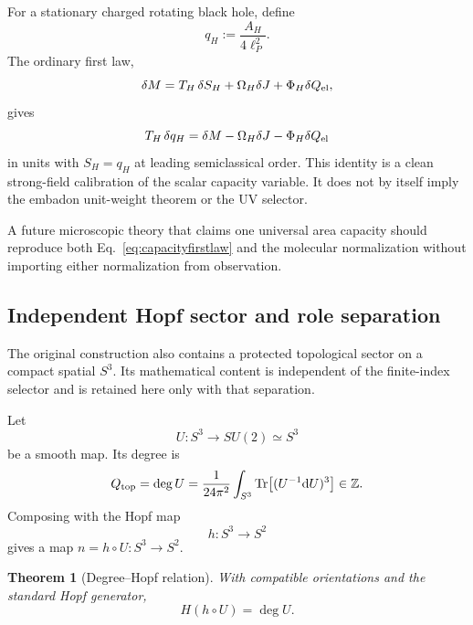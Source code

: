 \documentclass[aps,prd,preprint,nofootinbib,superscriptaddress]{revtex4-2}
\newtheorem{theorem}{Theorem}[section]
\theoremstyle{definition}
\theoremstyle{remark}
\newcommand{\Tr}{\operatorname{Tr}}
\newcommand{\dd}{\mathrm d}
\begin{document}
For a stationary charged rotating black hole, define
\begin{equation}
q_H:=\frac{A_H}{4\ell_P^2}.
\end{equation}
The ordinary first law,
\begin{equation}
\delta M
=
T_H\,\delta S_H+\Omega_H\delta J+\Phi_H\delta Q_{\rm el},
\end{equation}
gives
\begin{equation}
T_H\,\delta q_H
=
\delta M-\Omega_H\delta J-\Phi_H\delta Q_{\rm el}
\label{eq:capacityfirstlaw}
\end{equation}
in units with $S_H=q_H$ at leading semiclassical order.  This identity is a
clean strong-field calibration of the scalar capacity variable.  It does not
by itself imply the embadon unit-weight theorem or the UV selector.

A future microscopic theory that claims one universal area capacity should
reproduce both Eq.~\eqref{eq:capacityfirstlaw} and the molecular normalization
without importing either normalization from observation.

\subsection{Independent Hopf sector and role separation}

The original construction also contains a protected topological sector on a
compact spatial $S^3$.  Its mathematical content is independent of the
finite-index selector and is retained here only with that separation.

Let
\begin{equation}
U:S^3\longrightarrow SU(2)\simeq S^3
\label{eq:Umap}
\end{equation}
be a smooth map.  Its degree is
\begin{equation}
Q_{\rm top}
=
\deg U
=
\frac{1}{24\pi^2}
\int_{S^3}
\Tr\!\left[(U^{-1}\dd U)^3\right]
\in\mathbb Z.
\label{eq:degreeU}
\end{equation}
Composing with the Hopf map
\begin{equation}
h:S^3\to S^2
\end{equation}
gives a map $n=h\circ U:S^3\to S^2$.

\begin{theorem}[Degree--Hopf relation]
\label{thm:degreehopf}
With compatible orientations and the standard Hopf generator,
\begin{equation}
H(h\circ U)=\deg U.
\label{eq:degreehopf}
\end{equation}
\end{theorem}
\end{document}
